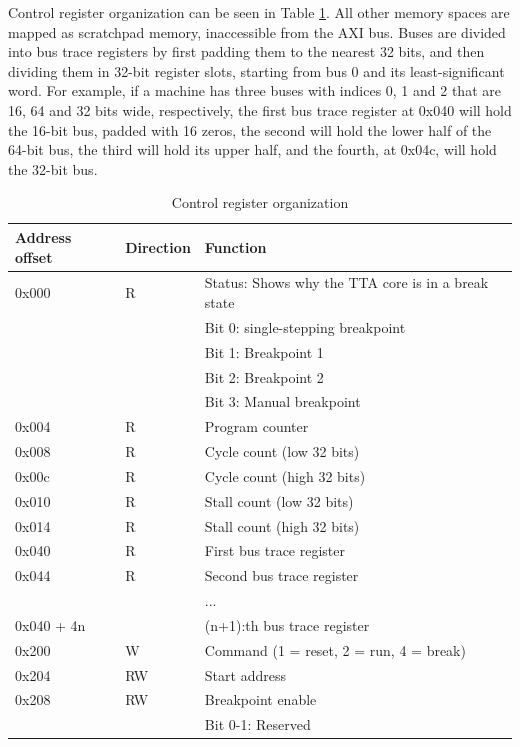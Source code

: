 \documentclass[a4paper,twoside]{tceusermanual}
\begin{document}
Control register organization can be seen in Table \ref{tab:almaif_ctrl}.
All other memory spaces are mapped as scratchpad memory, inaccessible from the
AXI bus. Buses are divided into bus trace registers by first padding them to
the nearest 32 bits, and then dividing them in 32-bit register slots,
starting from bus 0 and its least-significant word. For example, if a machine
has three buses with indices 0, 1 and 2 that are 16, 64 and 32 bits wide,
respectively, the first bus trace register at 0x040 will hold the 16-bit bus,
padded with 16 zeros, the second will hold the lower half of the 64-bit bus,
the third will hold its upper half, and the fourth, at 0x04c, will hold the
32-bit bus.

\begin{table}[h!]
  \begin{center}
    \caption{Control register organization}
    \label{tab:almaif_ctrl}
    \begin{tabular}{lll}
    \textbf{Address offset} &\textbf{Direction} &\textbf{Function} \\
    \hline
    0x000 & R & Status: Shows why the TTA core is in a break state \\
          &   & Bit 0: single-stepping breakpoint \\
          &   & Bit 1: Breakpoint 1 \\
          &   & Bit 2: Breakpoint 2 \\
          &   & Bit 3: Manual breakpoint \\
    0x004 & R & Program counter \\
    0x008 & R & Cycle count (low 32 bits) \\
    0x00c & R & Cycle count (high 32 bits) \\
    0x010 & R & Stall count (low 32 bits) \\
    0x014 & R & Stall count (high 32 bits) \\
    \hline
    0x040      & R & First bus trace register \\
    0x044      & R & Second bus trace register \\
               &   & ... \\
    0x040 + 4n &   & (n+1):th bus trace register \\
    \hline
    0x200 & W & Command (1 = reset, 2 = run, 4 = break) \\
    0x204 & RW & Start address \\
    0x208 & RW & Breakpoint enable \\
          &    & Bit 0-1: Reserved \\

\end{tabular}
\end{center}
\end{table}
\end{document}
